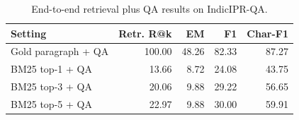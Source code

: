 \begin{table}[htbp]
\centering
\caption{End-to-end retrieval plus QA results on IndicIPR-QA.}
\label{tab:retrieval_qa}
\scriptsize
\begin{tabular}{lrrrr}
\toprule
Setting & Retr. R@k & EM & F1 & Char-F1 \\
\midrule
Gold paragraph + QA & 100.00 & 48.26 & 82.33 & 87.27 \\
BM25 top-1 + QA & 13.66 & 8.72 & 24.08 & 43.75 \\
BM25 top-3 + QA & 20.06 & 9.88 & 29.22 & 56.65 \\
BM25 top-5 + QA & 22.97 & 9.88 & 30.00 & 59.91 \\
\bottomrule
\end{tabular}
\end{table}

